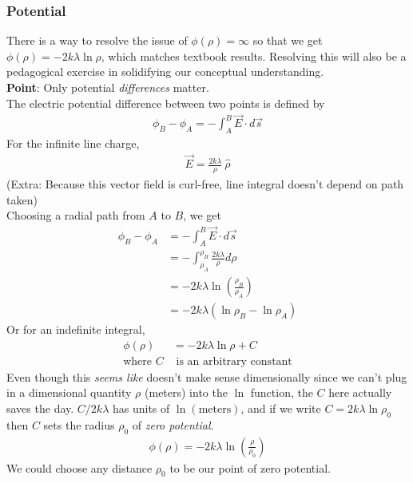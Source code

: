 \documentclass{article}
\begin{document}
\subsubsection{Potential}
There is a way to resolve the issue of $\phi(\rho) = \infty$ so that we get $\phi(\rho) = - 2k \lambda \ln \rho$, which matches textbook results. Resolving this will also be a pedagogical exercise in solidifying our conceptual understanding. \\[10pt]
\textbf{Point}: Only potential \textit{differences} matter.\\[10pt]
The electric potential difference between two points is defined by 
\begin{align}
    \phi_{B} - \phi_{A} = -\int_A^B \vec{E} \cdot d\vec{s}
\end{align}
For the infinite line charge, 
\begin{align}
    \vec{E} = \frac{2k\lambda}{\rho}\ \hat{\rho} 
\end{align}
(Extra: Because this vector field is curl-free, line integral doesn't depend on path taken)\\[10pt]
Choosing a radial path from $A$ to $B$, we get
\begin{align}
    \phi_B - \phi_A &= -\int_A^B \vec{E} \cdot d\vec{s} \\
    &= -\int_{\rho_A}^{\rho_B} \frac{2k\lambda}{\rho} d\rho \\
    &= - 2k\lambda \ln \left( \frac{\rho_B}{\rho_A} \right) \\ 
    &= - 2k\lambda \left( \ln \rho_B - \ln \rho_A \right) 
\end{align}
Or for an indefinite integral,
\begin{align}
    \phi(\rho) &= -2k \lambda \ln \rho + C \\
    \text{where } C &\text{ is an arbitrary constant}
\end{align}
Even though this \textit{seems like} doesn't make sense dimensionally since we can't plug in a dimensional quantity $\rho$ (meters) into the $\ln$ function, the $C$ here actually saves the day. $C/2k\lambda$ has units of $\ln (\text{meters})$, and if we write $C = 2k\lambda \ln \rho_0$ then $C$ sets the radius $\rho_0$ of \textit{zero potential}.
\begin{align}
    \phi(\rho) = -2k \lambda \ln \left(\frac{\rho}{\rho_0}\right) \label{eq:phirho}
\end{align}
We could choose any distance $\rho_0$ to be our point of zero potential. \\[10pt]
\end{document}
